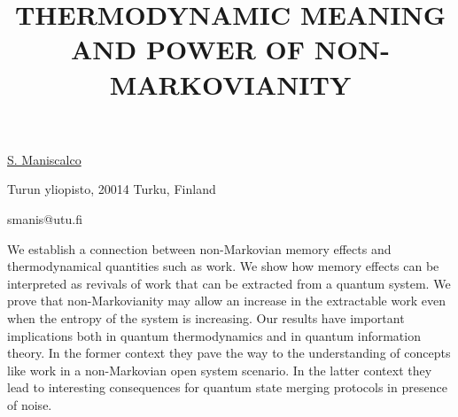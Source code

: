 \title{THERMODYNAMIC MEANING AND POWER OF NON-MARKOVIANITY}

\underline{S. Maniscalco} 

{\normalsize{\vspace{-4mm}
Turun yliopisto, 20014 Turku, Finland

\email smanis@utu.fi}}

We establish a connection between non-Markovian memory effects and thermodynamical quantities such as work. We show how
memory effects can be interpreted as revivals of work that can be extracted from a quantum system. We prove that non-Markovianity
may allow an increase in the extractable work even when the entropy of the system is increasing. Our results have important
implications both in quantum thermodynamics and in quantum information theory. In the former context they pave the way to the
understanding of concepts like work in a non-Markovian open system scenario. In the latter context they lead to interesting
consequences for quantum state merging protocols in presence of noise.


\vspace{\baselineskip}
